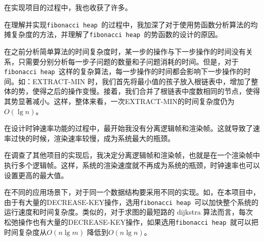 \documentclass{ctexart}
\newcommand{\fibheap}{\texttt{fibonacci heap }}
\begin{document}
在实现项目的过程中，我也收获了许多。
\begin{outline}[enumerate]
    \1 在理解并实现\fibheap 的过程中，我加深了对于使用势函数分析算法的均摊复杂度的方法，并理解了\fibheap 的势函数的设计的原因。

        在之前分析简单算法的时间复杂度时，某一步的操作与下一步操作的时间没有关系，只需要分别分析每一步子问题的数量和子问题消耗的时间。但是，对于\fibheap 这样的复杂算法，每一步操作的时间都会影响下一步操作的时间。如：EXTRACT-MIN 时，我们首先将最小值的孩子放入根链表中，增加了整体的势，使得之后的操作变慢。接着，我们合并了根链表中度数相同的节点，使得其势显著减小。这样，整体来看，一次EXTRACT-MIN的时间复杂度仍为$O(\lg n)$。
    
    \1 在设计时钟速率功能的过程中，最开始我没有分离逻辑帧和渲染帧。这就导致了速率过快的时候，渲染速率较慢，成为系统最大的瓶颈。

        在调查了其他项目的实现后，我决定分离逻辑帧和渲染帧，也就是在一个渲染帧中执行多个逻辑帧。这样，系统的渲染速度就不再成为系统的瓶颈，时钟速率也可以设置更高的最大值。
    
    \1 在不同的应用场景下，对于同一个数据结构要采用不同的实现。如，在本项目中，由于有大量的DECREASE-KEY操作，选用\fibheap 可以加快整个系统的运行速度和时间复杂度。类似的，对于求图的最短路的 dijkstra 算法而言，每次松弛操作也有大量的DECREASE-KEY操作，如果选用\fibheap 就可以把时间复杂度从$O(n \lg m)$ 降低到$O(n \lg n)$。
\end{outline}



\end{document}
